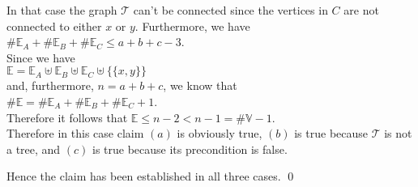 \begin{enumerate}
\begin{enumerate}
    In that case the graph $\mathcal{T}$ can't be connected since the vertices in $C$ are not connected to either $x$ or
    $y$.  Furthermore, we have
    \\[0.2cm]
    \hspace*{1.3cm}
    $\# \mathbb{E}_A + \# \mathbb{E}_B + \# \mathbb{E}_C \leq a + b + c - 3$.
    \\[0.2cm]
    Since we have
    \\[0.2cm]
    \hspace*{1.3cm}
    $\mathbb{E} = \mathbb{E}_A \uplus \mathbb{E}_B \uplus \mathbb{E}_C \uplus \bigl\{\{x,y\}\bigr\}$
    \\[0.2cm]
    and, furthermore, $n = a + b + c$, we know that
    \\[0.2cm]
    \hspace*{1.3cm}
    $\#\mathbb{E} = \#\mathbb{E}_A + \#\mathbb{E}_B + \#\mathbb{E}_C + 1$.
    \\[0.2cm]
    Therefore it follows that $\mathbb{E} \leq n - 2 < n - 1 = \#\mathbb{V} - 1$.
    \\[0.2cm]
    Therefore in this case claim $(a)$ is obviously true, $(b)$ is true because $\mathcal{T}$ is not a tree,
    and $(c)$ is true because its precondition is false.
     \green{$\surd$}
  \end{enumerate}
  Hence the claim has been established in all three cases. \qed
\end{enumerate} 

